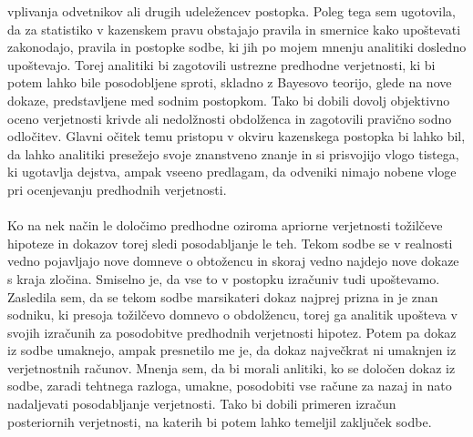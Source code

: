 \documentclass[12pt,a4paper]{amsart}
\theoremstyle{definition} %
\theoremstyle{plain} %
\begin{document}
vplivanja odvetnikov ali drugih udeležencev postopka. Poleg tega sem ugotovila, da za statistiko v kazenskem pravu obstajajo pravila in smernice kako upoštevati zakonodajo, pravila 
in postopke sodbe, ki jih po mojem mnenju analitiki dosledno upoštevajo. Torej analitiki bi zagotovili ustrezne predhodne verjetnosti, ki bi potem lahko bile posodobljene sproti, skladno z 
Bayesovo teorijo, glede na nove dokaze, predstavljene med sodnim postopkom. Tako bi dobili dovolj objektivno oceno verjetnosti krivde ali nedolžnosti 
obdolženca in zagotovili pravično sodno odločitev. Glavni očitek temu pristopu v okviru kazenskega postopka bi lahko bil, da lahko analitiki presežejo svoje znanstveno 
znanje in si prisvojijo vlogo tistega, ki ugotavlja dejstva, ampak vseeno predlagam, da odveniki nimajo nobene vloge pri ocenjevanju predhodnih verjetnosti.\\\\
Ko na nek način le določimo predhodne oziroma apriorne verjetnosti tožilčeve hipoteze in dokazov torej sledi posodabljanje le teh. Tekom sodbe se v realnosti vedno 
pojavljajo nove domneve o obtožencu in skoraj vedno najdejo nove dokaze s kraja zločina. Smiselno je, da vse to v postopku izračuniv tudi upoštevamo. Zasledila sem, da 
se tekom sodbe marsikateri dokaz najprej prizna in je znan sodniku, ki presoja tožilčevo domnevo o obdolžencu, torej ga analitik upošteva v svojih izračunih za posodobitve 
predhodnih verjetnosti hipotez. Potem pa dokaz iz sodbe umaknejo, ampak presnetilo me je, da dokaz največkrat ni umaknjen iz verjetnostnih računov. Mnenja sem, da bi 
morali anlitiki, ko se določen dokaz iz sodbe, zaradi tehtnega razloga, umakne, posodobiti vse račune za nazaj in nato nadaljevati posodabljanje verjetnosti. Tako bi 
dobili primeren izračun posteriornih verjetnosti, na katerih bi potem lahko temeljil zaključek sodbe. 

\end{document}
